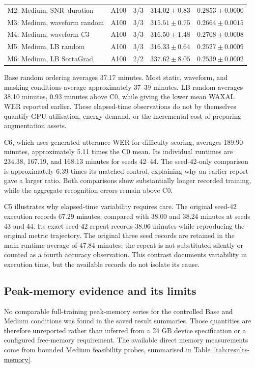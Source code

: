 \documentclass[12pt,a4paper]{report}
\begin{document}
\begin{table}[htbp]
\begin{tabular}{lrrr}
M2: Medium, SNR--duration & A100 & 3/3 & $314.02 \pm 0.83$ & $0.2853 \pm 0.0000$ \\
M3: Medium, waveform random & A100 & 3/3 & $315.51 \pm 0.75$ & $0.2664 \pm 0.0015$ \\
M4: Medium, waveform C3 & A100 & 3/3 & $316.50 \pm 1.48$ & $0.2708 \pm 0.0008$ \\
M5: Medium, LB random & A100 & 3/3 & $316.33 \pm 0.64$ & $0.2527 \pm 0.0009$ \\
M6: Medium, LB SortaGrad & A100 & 2/2 & $337.62 \pm 8.05$ & $0.2539 \pm 0.0002$ \\
\bottomrule\end{tabular}\end{table}

Base random ordering averages 37.17 minutes. Most static, waveform, and masking conditions average approximately 37--39 minutes. LB random averages 38.10 minutes, 0.93 minutes above C0, while giving the lower mean WAXAL WER reported earlier. These elapsed-time observations do not by themselves quantify GPU utilisation, energy demand, or the incremental cost of preparing augmentation assets.

C6, which uses generated utterance WER for difficulty scoring, averages 189.90 minutes, approximately 5.11 times the C0 mean. Its individual runtimes are 234.38, 167.19, and 168.13 minutes for seeds 42--44. The seed-42-only comparison is approximately 6.39 times its matched control, explaining why an earlier report gave a larger ratio. Both comparisons show substantially longer recorded training, while the aggregate recognition errors remain above C0.

C5 illustrates why elapsed-time variability requires care. The original seed-42 execution records 67.29 minutes, compared with 38.00 and 38.24 minutes at seeds 43 and 44. Its exact seed-42 repeat records 38.06 minutes while reproducing the original metric trajectory. The original three seed records are retained in the main runtime average of 47.84 minutes; the repeat is not substituted silently or counted as a fourth accuracy observation. This contrast documents variability in execution time, but the available records do not isolate its cause.

\subsection{Peak-memory evidence and its limits}

No comparable full-training peak-memory series for the controlled Base and Medium conditions was found in the saved result summaries. Those quantities are therefore unreported rather than inferred from a 24 GB device specification or a configured free-memory requirement. The available direct memory measurements come from bounded Medium feasibility probes, summarised in Table~\ref{tab:results-memory}.
\end{document}
